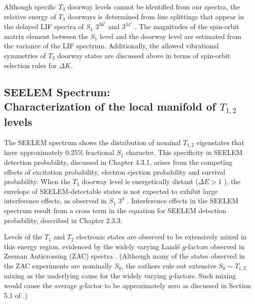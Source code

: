 \documentclass[12pt]{mitthesis}
\begin{document}
Although specific $T_3$ doorway levels cannot be identified from our
spectra, the relative energy of $T_3$ doorways is determined from line
splittings that appear in the delayed LIF spectra of $S_1$ $3^36^1$
 and $3^34^1$ .  The magnitudes of the spin-orbit matrix
element between the $S_1$ level and the doorway level are estimated
from the variance of the LIF spectrum.  Additionally, the allowed
vibrational symmetries of $T_3$ doorway states are discussed above in
terms of spin-orbit selection rules for $\Delta K$.

























\subsection{SEELEM Spectrum: \\Characterization of the local manifold of
  $T_{1,2}$ levels}

The SEELEM spectrum shows the distribution of nominal $T_{1,2}$
eigenstates that have approximately 0.25\% fractional $S_1$ character.
This specificity in SEELEM detection probability, discussed in Chapter
4.3.1, arises from the competing effects of excitation probability,
electron ejection probability and survival probability.  When the
$T_3$ doorway level is energetically distant ($\Delta E > 1$ \rcm),
the envelope of SEELEM-detectable states is not expected to exhibit
large interference effects, as observed in $S_1$ $3^3$ .
Interference effects in the SEELEM spectrum result from a cross term
in the equation for SEELEM detection probability, described in Chapter
2.3.3.

Levels of the $T_1$ and $T_2$ electronic states are observed to be
extensively mixed in this energy region, evidenced by the widely
varying Land\'{e} $g$-factors observed in Zeeman Anticrossing (ZAC)
spectra \cite{dupre95a}.  (Although many of the states observed in the
ZAC experiments are nominally $S_0$, the authors rule out extensive
$S_0 \sim T_{1,2}$ mixing as the underlying cause for the widely
varying $g$-factors.  Such mixing would cause the average $g$-factor
to be approximately zero as discussed in Section 5.1 of
\cite{dupre95a}.)
\end{document}
